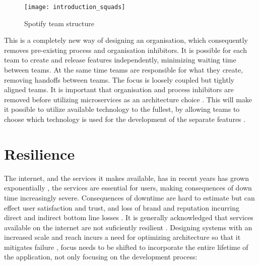 \begin{figure}[!htb]
  \begin{center} 
	  \texttt{[image: introduction\_squads]}
  \end{center}
  \caption{Spotify team structure \cite{kniberg2014spotify}}
  \label{fig:introduction_squads}
\end{figure}

This is a completely new way of designing an organisation, which consequently removes pre-existing process and organisation inhibitors. It is possible for each team to create and release features independently, minimizing waiting time between teams. At the same time teams are responsible for what they create, removing handoffs between teams. The focus is loosely coupled but tightly aligned teams.
It is important that organisation and process inhibitors are removed before utilizing microservices as an architecture choice \cite{meshenberg2016microservices}. This will make it possible to utilize available technology to the fullest, by allowing teams to choose which technology is used for the development of the separate features \cite{fowler2014polyglot}. 


\section{Resilience}
The internet, and the services it makes available, has in recent years has grown exponentially \cite[p.~4]{nygard2007release}, the services are essential for users, making consequences of down time increasingly severe. Consequences of downtime are hard to estimate but can effect user satisfaction and trust, and loss of brand and reputation incurring direct and indirect bottom line losses \cite[p.~26]{beyer2016siteReliabilityEngineering}. It is generally acknowledged that services available on the internet are not suficiently resilient \cite{sterbenz2010resilience}. Designing systems with an increased scale and reach incurs a need for optimizing architecture so that it mitigates failure \cite[p.~4]{nygard2007release}, focus needs to be shifted to incorporate the entire lifetime of the application, not only focusing on the development process:


